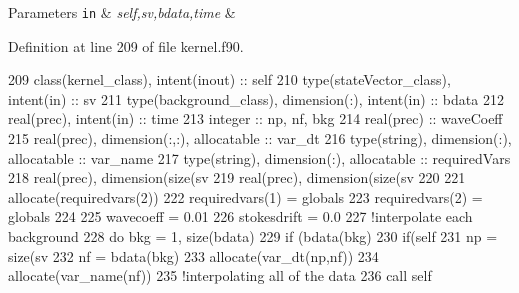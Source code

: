 \begin{DoxyParams}[1]{Parameters}
\mbox{\tt in}  & {\em self,sv,bdata,time} & \\
\hline
\end{DoxyParams}


Definition at line 209 of file kernel.\+f90.


\begin{DoxyCode}
209     \textcolor{keywordtype}{class}(kernel\_class), \textcolor{keywordtype}{intent(inout)} :: self
210     \textcolor{keywordtype}{type}(stateVector\_class), \textcolor{keywordtype}{intent(in)} :: sv
211     \textcolor{keywordtype}{type}(background\_class), \textcolor{keywordtype}{dimension(:)}, \textcolor{keywordtype}{intent(in)} :: bdata
212     \textcolor{keywordtype}{real(prec)}, \textcolor{keywordtype}{intent(in)} :: time
213     \textcolor{keywordtype}{integer} :: np, nf, bkg
214     \textcolor{keywordtype}{real(prec)} :: waveCoeff
215     \textcolor{keywordtype}{real(prec)}, \textcolor{keywordtype}{dimension(:,:)}, \textcolor{keywordtype}{allocatable} :: var\_dt
216     \textcolor{keywordtype}{type}(string), \textcolor{keywordtype}{dimension(:)}, \textcolor{keywordtype}{allocatable} :: var\_name
217     \textcolor{keywordtype}{type}(string), \textcolor{keywordtype}{dimension(:)}, \textcolor{keywordtype}{allocatable} :: requiredVars
218     \textcolor{keywordtype}{real(prec)}, \textcolor{keywordtype}{dimension(size(sv%
219     \textcolor{keywordtype}{real(prec)}, \textcolor{keywordtype}{dimension(size(sv%
220 
221     \textcolor{keyword}{allocate}(requiredvars(2))
222     requiredvars(1) = globals%
223     requiredvars(2) = globals%
224 
225     wavecoeff = 0.01
226     stokesdrift = 0.0
227     \textcolor{comment}{!interpolate each background}
228     \textcolor{keywordflow}{do} bkg = 1, \textcolor{keyword}{size}(bdata)
229         \textcolor{keywordflow}{if} (bdata(bkg)%
230             \textcolor{keywordflow}{if}(self%
231                 np = \textcolor{keyword}{size}(sv%
232                 nf = bdata(bkg)%
233                 \textcolor{keyword}{allocate}(var\_dt(np,nf))
234                 \textcolor{keyword}{allocate}(var\_name(nf))
235                 \textcolor{comment}{!interpolating all of the data}
236                 \textcolor{keyword}{call }self%
}}
\end{DoxyCode}
